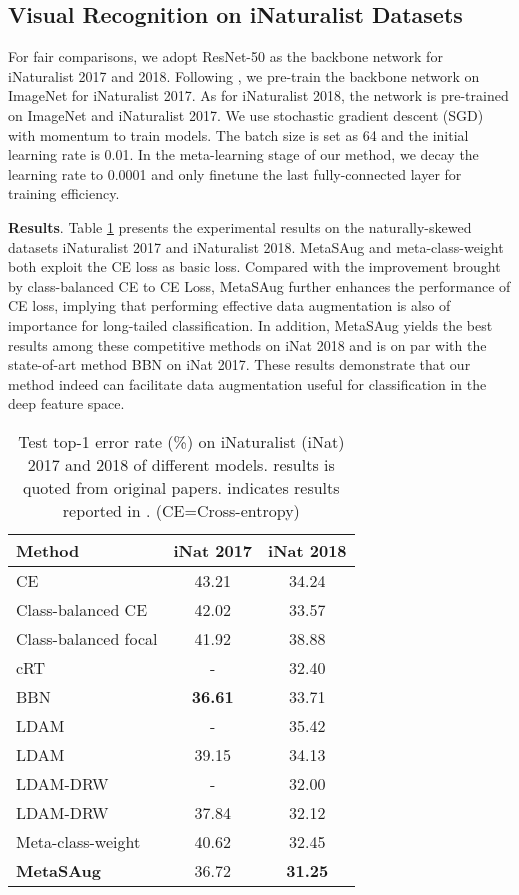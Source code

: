 \subsection{Visual Recognition on iNaturalist Datasets}
For fair comparisons, we adopt ResNet-50 \cite{resnet} as the backbone network for iNaturalist 2017 and 2018. Following \cite{jamal2020rethinking}, we pre-train the backbone network on ImageNet for iNaturalist 2017. As for iNaturalist 2018, the network is pre-trained on ImageNet and iNaturalist 2017. We use stochastic gradient descent (SGD) with momentum to train models. The batch size is set as 64 and the initial learning rate is 0.01. In the meta-learning stage of our method, we decay the learning rate to 0.0001 and only finetune the last fully-connected layer for training efficiency.

\textbf{Results}. Table \ref{tab:iNat} presents the experimental results on the naturally-skewed datasets iNaturalist 2017 and iNaturalist 2018. MetaSAug and meta-class-weight both exploit the CE loss as basic loss. Compared with the improvement brought by class-balanced CE \cite{cui2019class} to CE Loss, MetaSAug further enhances the performance of CE loss, implying that performing effective data augmentation is also of importance for long-tailed classification. In addition, MetaSAug yields the best results among these competitive methods on iNat 2018 and is on par with the state-of-art method BBN \cite{BBN} on iNat 2017. These results demonstrate that our method indeed can facilitate data augmentation useful for classification in the deep feature space.

\begin{table}
	\centering
	\caption {Test top-1 error rate (\%) on iNaturalist (iNat) 2017 and 2018 of different models. results is quoted from original papers.  indicates results reported in \cite{jamal2020rethinking}. (CE=Cross-entropy)}
	{\begin{tabular}{l|c|c}
			\hline
			Method & iNat 2017 & iNat 2018 \\ \hline
			CE & 43.21 & 34.24 \\ \hline
			Class-balanced CE \cite{cui2019class} & 42.02 & 33.57 \\ \hline
			Class-balanced focal \cite{cui2019class} & 41.92 & 38.88 \\ \hline
			cRT \cite{kang2019decoupling} & - & 32.40 \\ \hline
			BBN \cite{BBN} & \textbf{36.61} & 33.71 \\ \hline
			LDAM \cite{cao2019learning}  & - & 35.42 \\ \hline
			LDAM \cite{cao2019learning} & 39.15 & 34.13 \\ \hline
			LDAM-DRW \cite{cao2019learning} & - & 32.00  \\ \hline
			LDAM-DRW \cite{cao2019learning} & 37.84 & 32.12 \\ \hline
			Meta-class-weight \cite{jamal2020rethinking} & 40.62 & 32.45 \\ \hline
			\textbf{MetaSAug} & 36.72 & \textbf{31.25}\\ \hline
		\end{tabular}
	}\label{tab:iNat}
\end{table}



